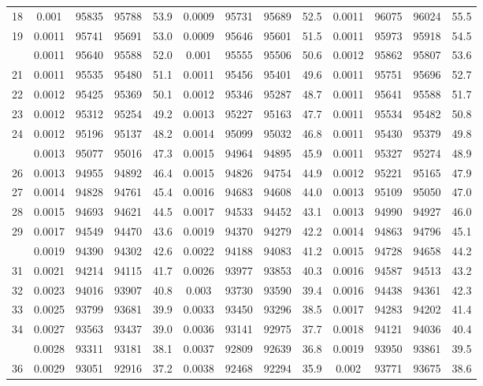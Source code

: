 \documentclass[
  14pt,
]{article}
\begin{document}
\begin{longtable}[t]{lcccccccccccc}
18 & 0.001 & 95835 & 95788 & 53.9 & 0.0009 & 95731 & 95689 & 52.5 & 0.0011 & 96075 & 96024 & 55.5\\
19 & 0.0011 & 95741 & 95691 & 53.0 & 0.0009 & 95646 & 95601 & 51.5 & 0.0011 & 95973 & 95918 & 54.5\\
\addlinespace
20 & 0.0011 & 95640 & 95588 & 52.0 & 0.001 & 95555 & 95506 & 50.6 & 0.0012 & 95862 & 95807 & 53.6\\
21 & 0.0011 & 95535 & 95480 & 51.1 & 0.0011 & 95456 & 95401 & 49.6 & 0.0011 & 95751 & 95696 & 52.7\\
22 & 0.0012 & 95425 & 95369 & 50.1 & 0.0012 & 95346 & 95287 & 48.7 & 0.0011 & 95641 & 95588 & 51.7\\
23 & 0.0012 & 95312 & 95254 & 49.2 & 0.0013 & 95227 & 95163 & 47.7 & 0.0011 & 95534 & 95482 & 50.8\\
24 & 0.0012 & 95196 & 95137 & 48.2 & 0.0014 & 95099 & 95032 & 46.8 & 0.0011 & 95430 & 95379 & 49.8\\
\addlinespace
25 & 0.0013 & 95077 & 95016 & 47.3 & 0.0015 & 94964 & 94895 & 45.9 & 0.0011 & 95327 & 95274 & 48.9\\
26 & 0.0013 & 94955 & 94892 & 46.4 & 0.0015 & 94826 & 94754 & 44.9 & 0.0012 & 95221 & 95165 & 47.9\\
27 & 0.0014 & 94828 & 94761 & 45.4 & 0.0016 & 94683 & 94608 & 44.0 & 0.0013 & 95109 & 95050 & 47.0\\
28 & 0.0015 & 94693 & 94621 & 44.5 & 0.0017 & 94533 & 94452 & 43.1 & 0.0013 & 94990 & 94927 & 46.0\\
29 & 0.0017 & 94549 & 94470 & 43.6 & 0.0019 & 94370 & 94279 & 42.2 & 0.0014 & 94863 & 94796 & 45.1\\
\addlinespace
30 & 0.0019 & 94390 & 94302 & 42.6 & 0.0022 & 94188 & 94083 & 41.2 & 0.0015 & 94728 & 94658 & 44.2\\
31 & 0.0021 & 94214 & 94115 & 41.7 & 0.0026 & 93977 & 93853 & 40.3 & 0.0016 & 94587 & 94513 & 43.2\\
32 & 0.0023 & 94016 & 93907 & 40.8 & 0.003 & 93730 & 93590 & 39.4 & 0.0016 & 94438 & 94361 & 42.3\\
33 & 0.0025 & 93799 & 93681 & 39.9 & 0.0033 & 93450 & 93296 & 38.5 & 0.0017 & 94283 & 94202 & 41.4\\
34 & 0.0027 & 93563 & 93437 & 39.0 & 0.0036 & 93141 & 92975 & 37.7 & 0.0018 & 94121 & 94036 & 40.4\\
\addlinespace
35 & 0.0028 & 93311 & 93181 & 38.1 & 0.0037 & 92809 & 92639 & 36.8 & 0.0019 & 93950 & 93861 & 39.5\\
36 & 0.0029 & 93051 & 92916 & 37.2 & 0.0038 & 92468 & 92294 & 35.9 & 0.002 & 93771 & 93675 & 38.6\\

\end{longtable}
\end{document}
